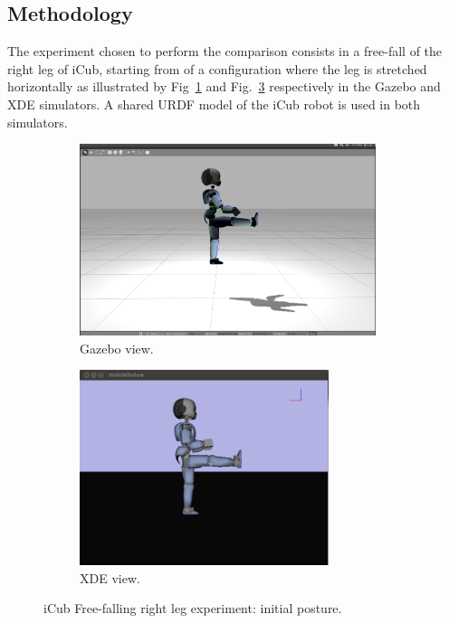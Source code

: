\documentclass[12pt,a4paper,twoside]{article}
\begin{document}
\subsection{Methodology}

The experiment chosen to perform the comparison consists in a free-fall of the right leg of iCub, starting from of a configuration where the leg is stretched horizontally as illustrated by Fig~\ref{fig:exp-gazebo} and Fig.~\ref{fig:exp-xde} respectively in the Gazebo and XDE simulators. A shared URDF model of the iCub robot is used in both simulators.

\begin{figure}[h]
\begin{center}
\begin{subfigure}[b]{0.49\textwidth}
\centering
\includegraphics[width=0.95\textwidth]{icub_gazebo_knee.png} 
\caption{Gazebo view.}
\label{fig:exp-gazebo}
\end{subfigure}
\begin{subfigure}[b]{0.49\textwidth}
\centering
\includegraphics[width=0.8\textwidth]{icub_xde_knee.png}
\caption{XDE view.}
\label{fig:exp-xde}
\end{subfigure}
\caption{iCub Free-falling right leg experiment: initial posture.}
\end{center}
\end{figure}
\end{document}
